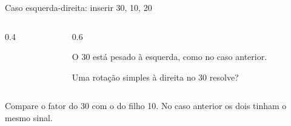 \documentclass{beamer}
\begin{document}
\begin{frame}{Caso esquerda-direita: inserir 30, 10, 20}
  \begin{columns}
    \begin{column}{0.4\textwidth}
      \centering
    \end{column}
    \begin{column}{0.6\textwidth}
      \begin{block}{}
        O 30 está pesado à esquerda, como no caso anterior.

        \vspace{0.3cm}
        Uma rotação simples à direita no 30 resolve?
      \end{block}
    \end{column}
  \end{columns}

  \vspace{0.5cm}
  \centering
  Compare o fator do 30 com o do filho 10. No caso anterior os dois tinham o
  mesmo sinal.
\end{frame}
\end{document}
